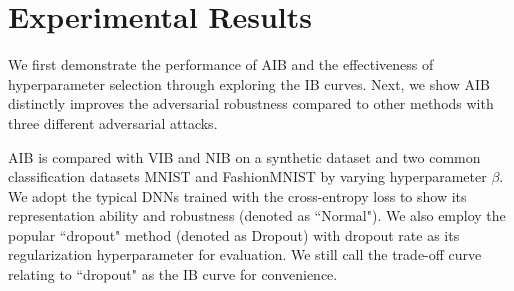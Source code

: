 \documentclass[10pt,journal,compsoc]{IEEEtran}
\begin{document}
\section{Experimental Results}\label{sec:experiments}
We first demonstrate the performance of AIB and the effectiveness of hyperparameter selection through exploring the IB curves. Next, we show AIB distinctly improves the adversarial robustness compared to other methods with three different adversarial attacks.

AIB is compared with VIB \cite{Alemi2017DeepVI} and NIB \cite{Kolchinsky2019NonlinearIB} on a synthetic dataset \cite{ShwartzZiv2017OpeningTB} and two common classification datasets MNIST \cite{LeCun1998GradientbasedLA} and FashionMNIST \cite{Xiao2017FashionMNISTAN} by varying hyperparameter $\beta$.  We adopt the typical DNNs trained with the cross-entropy loss to show its representation ability and robustness (denoted as ``Normal"). We also employ the popular ``dropout" method (denoted as Dropout) with dropout rate as its regularization hyperparameter for evaluation. We still call the trade-off curve relating to ``dropout" as the IB curve for convenience.
\end{document}
